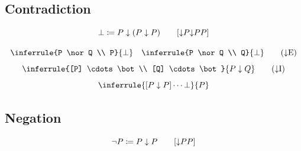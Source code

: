\subsection{Contradiction}

\newcommand{\norbot}[1]{{\nor}#1{\nor}#1#1} %
\begin{notation}
    \[\bot \coloneqq P \nor (P \nor P) \qquad [\norbot{P}]\]
\end{notation}

\begin{foundation}
    \begin{equation}
        \inferrule{P \nor Q \\ P}{\bot} \quad \inferrule{P \nor Q \\ Q}{\bot}
        \tag{{$\nor$}E}
        \label{rule:nor-elimination}
    \end{equation}
    \begin{equation}
        \inferrule{[P] \cdots \bot \\ [Q] \cdots \bot}{P \nor Q}
        \tag{{$\nor$}I}
        \label{rule:nor-introduction}
    \end{equation}
    \begin{equation}
        \inferrule{[P \nor P] \cdots \bot}{P}
        \label{rule:nor-reductio-ad-absurdum}
    \end{equation}
\end{foundation}


\subsection{Negation}

\newcommand{\norneg}[1]{{\nor}#1#1} %
\begin{notation}
    \[\neg P \coloneqq P \nor P \qquad [\norneg{P}]\]
\end{notation}

